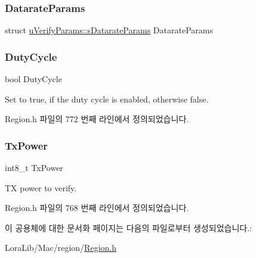 \subsubsection{\texorpdfstring{Datarate\+Params}{DatarateParams}}
{\footnotesize\ttfamily struct \mbox{\hyperlink{structu_verify_params_1_1s_datarate_params}{u\+Verify\+Params\+::s\+Datarate\+Params}} Datarate\+Params}

\mbox{\label{unionu_verify_params_a72f580d8a64ab70f5c4f7e10a694c65b}} 
\subsubsection{\texorpdfstring{Duty\+Cycle}{DutyCycle}}
{\footnotesize\ttfamily bool Duty\+Cycle}

Set to true, if the duty cycle is enabled, otherwise false. 

Region.\+h 파일의 772 번째 라인에서 정의되었습니다.

\mbox{\label{unionu_verify_params_a037b4f849fa8ed4aa1d3c58aef2b28ec}} 
\subsubsection{\texorpdfstring{Tx\+Power}{TxPower}}
{\footnotesize\ttfamily int8\+\_\+t Tx\+Power}

TX power to verify. 

Region.\+h 파일의 768 번째 라인에서 정의되었습니다.



이 공용체에 대한 문서화 페이지는 다음의 파일로부터 생성되었습니다.\+:\begin{DoxyCompactItemize}
\item 
Lora\+Lib/\+Mac/region/\mbox{\hyperlink{_region_8h}{Region.\+h}}\end{DoxyCompactItemize}

